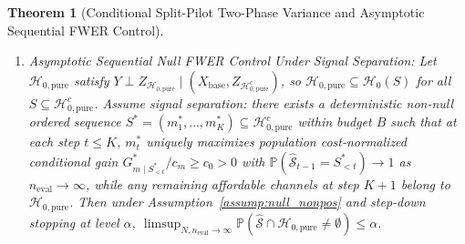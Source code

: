 \documentclass[11pt]{article}
\newtheorem{theorem}{Theorem}
\theoremstyle{remark}
\begin{document}
\begin{theorem}[Conditional Split-Pilot Two-Phase Variance and Asymptotic Sequential FWER Control]
\begin{enumerate}
\begin{equation}
    \label{eq:var_hat_app}
  \end{equation}
  satisfies $\mathbb{E}_{\text{II}}[\widehat{V}_{\text{II}} \mid \mathcal{F}_{\text{I}}, \mathcal{P}_{\text{fit}}] = \operatorname{Var}_{\text{II}}(\hat{G} \mid \mathcal{F}_{\text{I}}, \mathcal{P}_{\text{fit}})$ and reduces to $s^2 / n_{\text{eval}}$ under unclustered SRS ($H=1$).
  \item \emph{Asymptotic Sequential Null FWER Control Under Signal Separation:} Let $\mathcal{H}_{0,\text{pure}}$ satisfy $Y \perp Z_{\mathcal{H}_{0,\text{pure}}} \mid (X_{\text{base}}, Z_{\mathcal{H}_{0,\text{pure}}^c})$, so $\mathcal{H}_{0,\text{pure}} \subseteq \mathcal{H}_0(S)$ for all $S \subseteq \mathcal{H}_{0,\text{pure}}^c$. Assume \emph{signal separation}: there exists a deterministic non-null ordered sequence $S^* = (m_1^*, \dots, m_K^*) \subseteq \mathcal{H}_{0,\text{pure}}^c$ within budget $B$ such that at each step $t \le K$, $m_t^*$ uniquely maximizes population cost-normalized conditional gain $G_{m \mid S_{<t}^*}^* / c_m \ge c_0 > 0$ with $\mathbb{P}(\widehat{\mathcal{S}}_{t-1} = S_{<t}^*) \to 1$ as $n_{\text{eval}} \to \infty$, while any remaining affordable channels at step $K+1$ belong to $\mathcal{H}_{0,\text{pure}}$. Then under Assumption~\ref{assump:null_nonpos} and \citet{holm1979simple} step-down stopping at level $\alpha$, $\limsup_{N, n_{\text{eval}} \to \infty} \mathbb{P}(\widehat{\mathcal{S}} \cap \mathcal{H}_{0,\text{pure}} \ne \emptyset) \le \alpha$.
\end{enumerate}
\end{theorem}
\end{document}
